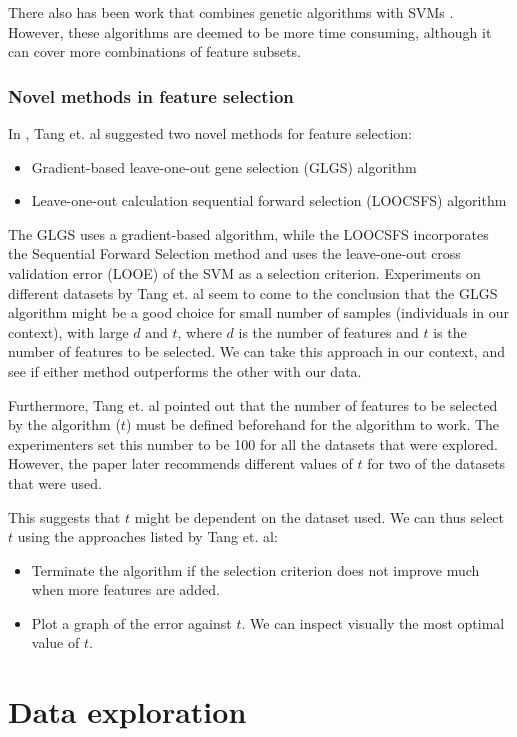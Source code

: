 \documentclass[12pt, twoside, a4paper]{report}
\begin{document}
There also has been work that combines genetic algorithms with SVMs \cite{RefWorks:120}. However, these algorithms are deemed to be more time consuming, although it can cover more combinations of feature subsets.

\subsection{Novel methods in feature selection} \label{bg_GLGS}
In \cite{RefWorks:119}, Tang et. al suggested two novel methods for feature selection:
\begin{itemize}
\item Gradient-based leave-one-out gene selection (GLGS) algorithm
\item Leave-one-out calculation sequential forward selection (LOOCSFS) algorithm
\end{itemize}

The GLGS uses a gradient-based algorithm, while the LOOCSFS incorporates the Sequential Forward Selection method and uses the leave-one-out cross validation error (LOOE) of the SVM as a selection criterion. Experiments on different datasets by Tang et. al seem to come to the conclusion that the GLGS algorithm might be a good choice for small number of samples (individuals in our context), with large $d$ and $t$, where $d$ is the number of features and $t$ is the number of features to be selected. We can take this approach in our context, and see if either method outperforms the other with our data.

Furthermore, Tang et. al pointed out that the number of features to be selected by the algorithm ($t$) must be defined beforehand for the algorithm to work. The experimenters set this number to be 100 for all the datasets that were explored. However, the paper later recommends different values of $t$ for two of the datasets that were used.

This suggests that $t$ might be dependent on the dataset used. We can thus select $t$ using the approaches listed by Tang et. al:
\begin{itemize}
\item Terminate the algorithm if the selection criterion does not improve much when more features are added.
\item Plot a graph of the error against $t$. We can inspect visually the most optimal value of $t$.
\end{itemize}

\chapter{Data exploration}
\end{document}
